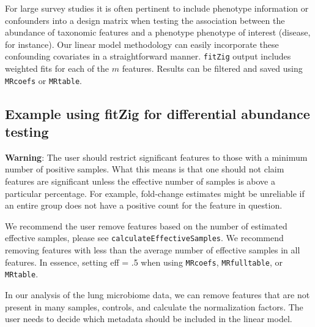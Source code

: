 \documentclass[a4paper,11pt]{article}\usepackage[]{graphicx}\usepackage[]{color}
\begin{document}
For large survey studies it is often pertinent to include phenotype information or confounders into a design matrix when testing the association between the abundance of taxonomic features and a phenotype phenotype of interest (disease, for
instance). Our linear model methodology can easily incorporate these
confounding covariates in a straightforward manner. \texttt{fitZig} output includes weighted fits for each of the $m$ features. Results can be filtered and saved using \texttt{MRcoefs} or \texttt{MRtable}.

\subsection{Example using fitZig for differential abundance testing}
\textbf{Warning}: The user should restrict significant features to those with a minimum number of positive samples. What this means is that one should not claim features are significant unless the effective number of samples is above a particular percentage. For example, fold-change estimates might be unreliable if an entire group does not have a positive count for the feature in question.


We recommend the user remove features based on the number of estimated effective samples, please see \texttt{calculateEffectiveSamples}. We recommend removing features with less than the average number of effective samples in all features. In essence, setting eff = .5 when using \texttt{MRcoefs}, \texttt{MRfulltable}, or \texttt{MRtable}.

In our analysis of the lung microbiome data, we can remove features that are not present in many samples, controls, and calculate the normalization factors. The user needs to decide which metadata should be included in the linear model.
\end{document}
